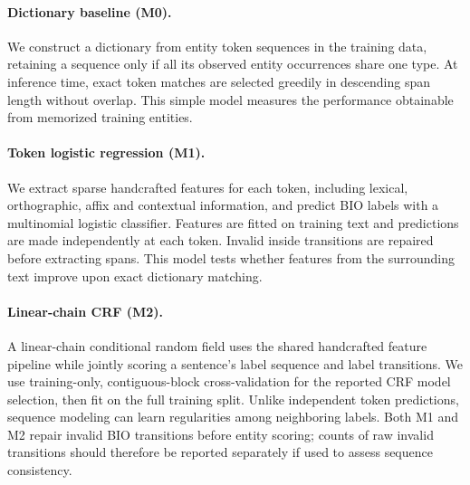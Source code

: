 \paragraph{Dictionary baseline (M0).}
We construct a dictionary from entity token sequences in the training data,
retaining a sequence only if all its observed entity occurrences share one
type. At inference time, exact token matches are selected greedily in
descending span length without overlap. This simple model measures the
performance obtainable from memorized training entities.

\paragraph{Token logistic regression (M1).}
We extract sparse handcrafted features for each token, including lexical,
orthographic, affix and contextual information, and predict BIO labels with a
multinomial logistic classifier. Features are fitted on training text and
predictions are made independently at each token. Invalid inside transitions
are repaired before extracting spans. This model tests whether features from
the surrounding text improve upon exact dictionary matching.

\paragraph{Linear-chain CRF (M2).}
A linear-chain conditional random field uses the shared handcrafted feature
pipeline while jointly scoring a sentence's label sequence and label
transitions. We use training-only, contiguous-block cross-validation for the
reported CRF model selection, then fit on the full training split. Unlike
independent token predictions, sequence modeling can learn regularities among
neighboring labels. Both M1 and M2 repair invalid BIO transitions before
entity scoring; counts of raw invalid transitions should therefore be reported
separately if used to assess sequence consistency.

